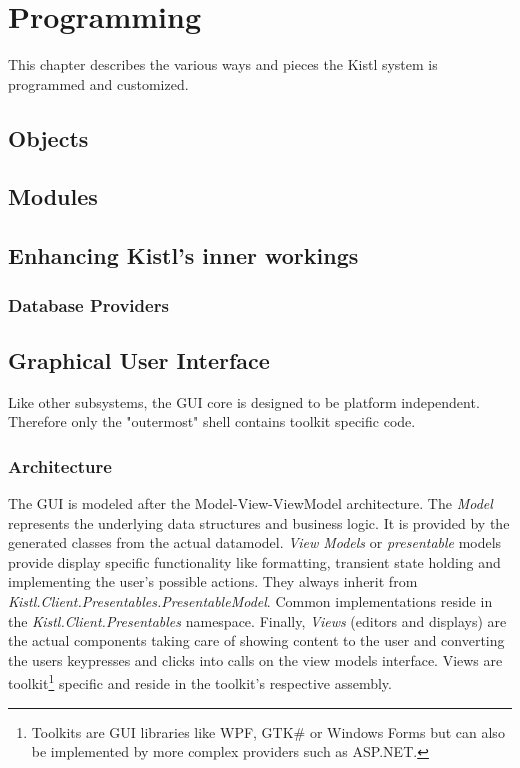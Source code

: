 \chapter{Programming}

This chapter describes the various ways and pieces the Kistl system is
programmed and customized.

\section{Objects}

\section{Modules}

\section{Enhancing Kistl's inner workings}

\subsection{Database Providers}

\section{Graphical User Interface}

Like other subsystems, the GUI core is designed to be platform
independent. Therefore only the "outermost" shell contains toolkit
specific code.

\subsection{Architecture}

The GUI is modeled after the Model-View-ViewModel architecture. The
\emph{Model} represents the underlying data structures and business
logic. It is provided by the generated classes from the actual
datamodel. \emph{View Models} or \emph{presentable} models provide
display specific functionality like formatting, transient state holding
and implementing the user's possible actions. They always inherit from
\emph{Kistl.Client.Presentables.PresentableModel}.
Common implementations reside in the
\emph{Kistl.Client.Presentables} namespace. Finally,
\emph{Views} (editors and displays) are the actual components taking
care of showing content to the user and converting the users keypresses
and clicks into calls on the view models interface.  Views are
toolkit\footnote{Toolkits are GUI libraries like WPF, GTK\# or Windows
Forms but can also be implemented by more complex providers such as
ASP.NET.} specific and reside in the toolkit's respective assembly.

